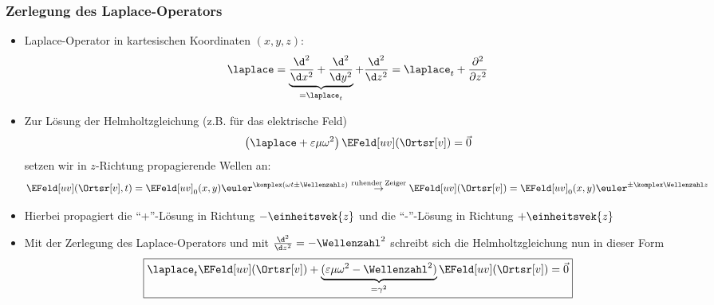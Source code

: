 \begin{frame}
  \frametitle{Zerlegung des Laplace-Operators}
       \begin{itemize}[<+->]
       \item Laplace-Operator in kartesischen Koordinaten \((x,y,z)\):
         \begin{equation*}
           \laplace = \underbrace{\frac{\d^2}{\d x^2}+\frac{\d^2}{\d y^2}}_{=\laplace_t}+\frac{\d^2}{\d z^2} = \laplace_t + \frac{\partial^{2}}{\partial z^{2}}
           \end{equation*}
       \item Zur Lösung der Helmholtzgleichung (z.B. für das elektrische Feld)
         \begin{equation*}
           \left(\laplace + \varepsilon\mu\omega^2\right) \EFeld[uv](\Ortsr[v]) =\vec{0}
         \end{equation*}
         setzen wir \alert{in \(z\)-Richtung propagierende Wellen} an:
         \begin{equation*}
           \EFeld[uv](\Ortsr[v], t) = \EFeld[uv]_0(x,y) \euler^{\komplex(\omega t \pm \Wellenzahl z)} \stackrel{\text{ruhender Zeiger}}{\to}  \EFeld[uv](\Ortsr[v]) = \EFeld[uv]_0(x,y) \euler^{\pm\komplex\Wellenzahl z}
         \end{equation*}
       \item Hierbei propagiert die \enquote{+}-Lösung in Richtung \(-\einheitsvek{z}\) und die \enquote{-}-Lösung in Richtung \(+\einheitsvek{z}\)
       \item Mit der Zerlegung des Laplace-Operators und mit \(\frac{\d^2}{\d z^2} = -\Wellenzahl^2\) schreibt sich die Helmholtzgleichung nun in dieser Form
         \begin{equation*}
           \boxed{\laplace_t \EFeld[uv](\Ortsr[v]) + \underbrace{(\varepsilon\mu\omega^2 - \Wellenzahl^2)}_{=\gamma^2} \EFeld[uv](\Ortsr[v]) =\vec{0}}
           \end{equation*}
       \end{itemize}
\end{frame}

